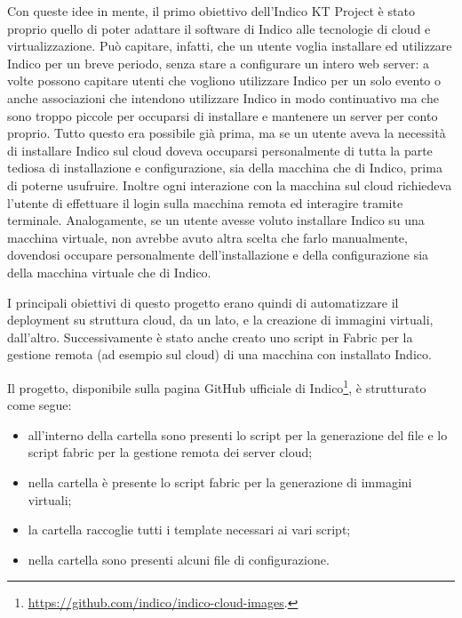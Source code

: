     Con queste idee in mente, il primo obiettivo dell'Indico KT Project è stato proprio quello di poter adattare il software di Indico alle tecnologie di cloud e virtualizzazione. Può capitare, infatti, che un utente voglia installare ed utilizzare Indico per un breve periodo, senza stare a configurare un intero web server: a volte possono capitare utenti che vogliono utilizzare Indico per un solo evento o anche associazioni che intendono utilizzare Indico in modo continuativo ma che sono troppo piccole per occuparsi di installare e mantenere un server per conto proprio. Tutto questo era possibile già prima, ma se un utente aveva la necessità di installare Indico sul cloud doveva occuparsi personalmente di tutta la parte tediosa di installazione e configurazione, sia della macchina che di Indico, prima di poterne usufruire. Inoltre ogni interazione con la macchina sul cloud richiedeva l'utente di effettuare il login sulla macchina remota ed interagire tramite terminale. Analogamente, se un utente avesse voluto installare Indico su una macchina virtuale, non avrebbe avuto altra scelta che farlo manualmente, dovendosi occupare personalmente dell'installazione e della configurazione sia della macchina virtuale che di Indico.
    
    I principali obiettivi di questo progetto erano quindi di automatizzare il deployment su struttura cloud, da un lato, e la creazione di immagini virtuali, dall'altro. Successivamente è stato anche creato uno script in Fabric per la gestione remota (ad esempio sul cloud) di una macchina con installato Indico.
    
    Il progetto, disponibile sulla pagina GitHub ufficiale di Indico\footnote{\url{https://github.com/indico/indico-cloud-images}.}, è strutturato come segue:
    
    \begin{itemize}
        \item all'interno della cartella  sono presenti lo script per la generazione del file  e lo script fabric per la gestione remota dei server cloud;
        \item nella cartella  è presente lo script fabric per la generazione di immagini virtuali;
        \item la cartella  raccoglie tutti i template necessari ai vari script;
        \item nella cartella  sono presenti alcuni file di configurazione.
    \end{itemize}
    

